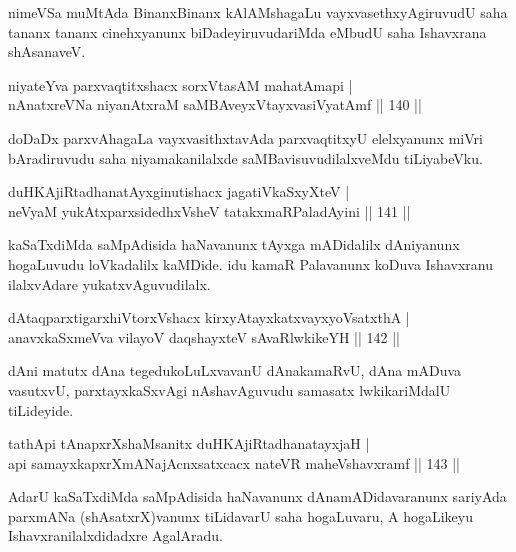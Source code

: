 \begin{artha}
nimeVSa muMtAda BinanxBinanx kAlAMshagaLu vayxvasethxyAgiruvudU saha tananx tananx cinehxyanunx biDadeyiruvudariMda eMbudU saha Ishavxrana shAsanaveV.
\end{artha}


\begin{shl}
niyateYva parxvaqtitxshacx sorxVtasAM mahatAmapi |\\
nAnatxreVNa niyanAtxraM saMBAveyxVtayxvasiVyatAmf \hfill || 140 ||
\end{shl}

\begin{artha}
doDaDx parxvAhagaLa vayxvasithxtavAda parxvaqtitxyU elelxyanunx miVri bAradiruvudu saha niyamakanilalxde saMBavisuvudilalxveMdu tiLiyabeVku.
\end{artha}

\begin{shl}
duHKAjiRtadhanatAyxginutishacx jagatiVkaSxyXteV |\\
neVyaM yukAtx\s parxsidedhxVsheV tatakxmaRPaladAyini \hfill || 141 ||
\end{shl}

\begin{artha}
kaSaTxdiMda saMpAdisida haNavanunx tAyxga mADidalilx dAniyanunx hogaLuvudu loVkadalilx kaMDide. idu kamaR Palavanunx koDuva Ishavxranu ilalxvAdare yukatxvAguvudilalx.
\end{artha}


\begin{shl}
dAtaqparxtigarxhiVtorxVshacx kirxyAtayxkatxvayxyoVsatxthA |\\
anavxkaSxmeVva vilayoV daqshayxteV sAvaRlwkikeYH \hfill || 142 ||
\end{shl}

\begin{artha}
dAni matutx dAna tegedukoLuLxvavanU dAnakamaRvU, dAna mADuva vasutxvU, parxtayxkaSxvAgi nAshavAguvudu samasatx lwkikariMdalU tiLideyide.
\end{artha}

\begin{shl}
tathA\s pi tAnapxrXshaMsanitx duHKAjiRtadhanatayxjaH |\\
api samayxkapxrXmANajAcnxsatxcacx nateVR maheVshavxramf \hfill || 143 ||
\end{shl}

\begin{artha}%
AdarU kaSaTxdiMda saMpAdisida haNavanunx dAnamADidavaranunx sariyAda parxmANa (shAsatxrX)vanunx tiLidavarU saha hogaLuvaru, A hogaLikeyu Ishavxranilalxdidadxre AgalAradu.
\end{artha}

